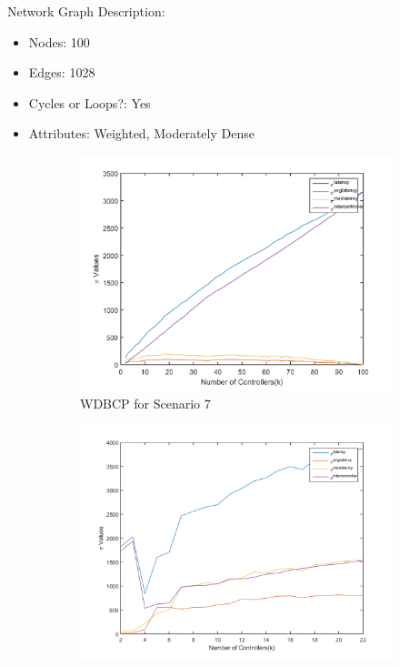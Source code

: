 \documentclass[10pt]{extarticle}
\begin{document}
	Network Graph Description:
	\begin{itemize}
		\item Nodes: 100
		\item Edges: 1028
		\item Cycles or Loops?: Yes
		\item Attributes: Weighted, Moderately Dense
	\end{itemize}
	
	\begin{figure}
		\begin{subfigure}{0.5\linewidth}
			\includegraphics[width=\linewidth]{wdbcp_7.png}
			\caption{WDBCP for Scenario 7}
			\label{fig:wdbcp7}
		\end{subfigure}
		\begin{subfigure}{0.5\linewidth}
			\includegraphics[width=\linewidth]{gspici_7.png}

\end{subfigure}
\end{figure}
\end{document}
